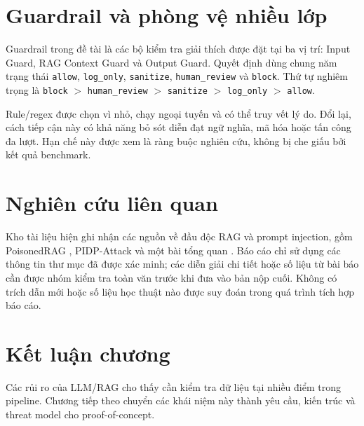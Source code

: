 \section{Guardrail và phòng vệ nhiều lớp}

Guardrail trong đề tài là các bộ kiểm tra giải thích được đặt tại ba vị trí:
Input Guard, RAG Context Guard và Output Guard. Quyết định dùng chung năm trạng
thái \texttt{allow}, \texttt{log\_only}, \texttt{sanitize},
\texttt{human\_review} và \texttt{block}. Thứ tự nghiêm trọng là
\texttt{block} $>$ \texttt{human\_review} $>$ \texttt{sanitize} $>$
\texttt{log\_only} $>$ \texttt{allow}.

Rule/regex được chọn vì nhỏ, chạy ngoại tuyến và có thể truy vết lý do. Đổi lại,
cách tiếp cận này có khả năng bỏ sót diễn đạt ngữ nghĩa, mã hóa hoặc tấn công đa
lượt. Hạn chế này được xem là ràng buộc nghiên cứu, không bị che giấu bởi kết
quả benchmark.

\section{Nghiên cứu liên quan}

Kho tài liệu hiện ghi nhận các nguồn về đầu độc RAG và prompt injection, gồm
PoisonedRAG \cite{zou2024poisonedrag}, PIDP-Attack
\cite{wang2026pidpattack} và một bài tổng quan \cite{gulyamov2026review}. Báo
cáo chỉ sử dụng các thông tin thư mục đã được xác minh; các diễn giải chi tiết
hoặc số liệu từ bài báo cần được nhóm kiểm tra toàn văn trước khi đưa vào bản
nộp cuối. Không có trích dẫn mới hoặc số liệu học thuật nào được suy đoán trong
quá trình tích hợp báo cáo.

\section{Kết luận chương}

Các rủi ro của LLM/RAG cho thấy cần kiểm tra dữ liệu tại nhiều điểm trong
pipeline. Chương tiếp theo chuyển các khái niệm này thành yêu cầu, kiến trúc và
threat model cho proof-of-concept.

